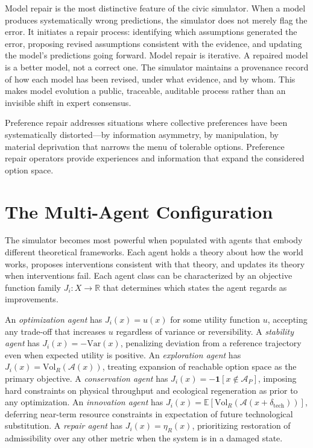 \documentclass[12pt]{article}
\begin{document}
Model repair is the most distinctive feature of the civic simulator. When a model produces systematically wrong predictions, the simulator does not merely flag the error. It initiates a repair process: identifying which assumptions generated the error, proposing revised assumptions consistent with the evidence, and updating the model's predictions going forward. Model repair is iterative. A repaired model is a better model, not a correct one. The simulator maintains a provenance record of how each model has been revised, under what evidence, and by whom. This makes model evolution a public, traceable, auditable process rather than an invisible shift in expert consensus.

Preference repair addresses situations where collective preferences have been systematically distorted---by information asymmetry, by manipulation, by material deprivation that narrows the menu of tolerable options. Preference repair operators provide experiences and information that expand the considered option space.

\section{The Multi-Agent Configuration}

The simulator becomes most powerful when populated with agents that embody different theoretical frameworks. Each agent holds a theory about how the world works, proposes interventions consistent with that theory, and updates its theory when interventions fail. Each agent class can be characterized by an objective function family $J_i : X \to \mathbb{R}$ that determines which states the agent regards as improvements.

An \emph{optimization agent} has $J_i(x) = u(x)$ for some utility function $u$, accepting any trade-off that increases $u$ regardless of variance or reversibility. A \emph{stability agent} has $J_i(x) = -\mathrm{Var}(x)$, penalizing deviation from a reference trajectory even when expected utility is positive. An \emph{exploration agent} has $J_i(x) = \mathrm{Vol}_R(\mathcal{A}(x))$, treating expansion of reachable option space as the primary objective. A \emph{conservation agent} has $J_i(x) = -\mathbf{1}[x \notin \mathcal{A}_P]$, imposing hard constraints on physical throughput and ecological regeneration as prior to any optimization. An \emph{innovation agent} has $J_i(x) = \mathbb{E}[\mathrm{Vol}_R(\mathcal{A}(x + \delta_{\text{tech}}))]$, deferring near-term resource constraints in expectation of future technological substitution. A \emph{repair agent} has $J_i(x) = \eta_R(x)$, prioritizing restoration of admissibility over any other metric when the system is in a damaged state.
\end{document}
